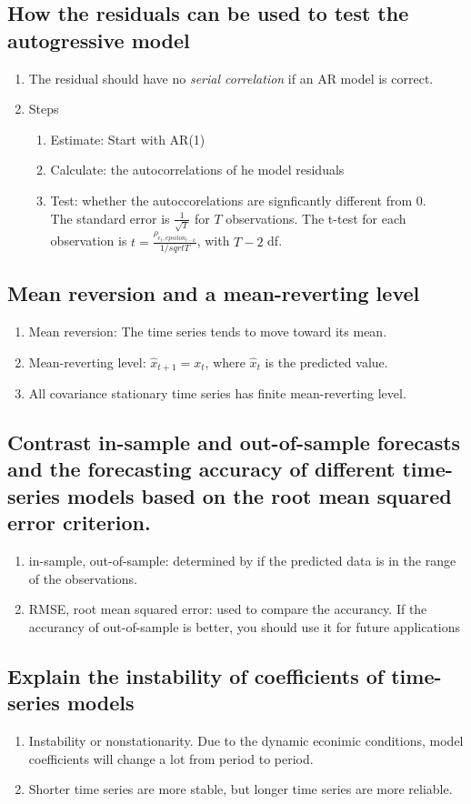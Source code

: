\documentclass{article}
\newcommand{\be}{\begin{enumerate}}
\newcommand{\ee}{\end{enumerate}}
\begin{document}
\subsection{How the residuals can be used to test the autogressive model}
\be
    \item The residual should have no {\it serial correlation} if an AR model is correct.
    \item Steps
        \be
            \item Estimate: Start with AR(1)
            \item Calculate: the autocorrelations of he model residuals
            \item Test: whether the autoccorelations are signficantly different from 0.
                \\The standard error is $\frac{1}{\sqrt{T}}$ for $T$ observations. The t-test for each
                observation is $t=\frac{\rho_{\epsilon_t,epsilon_{t-k}}}{1/sqrt{T}}$, with $T-2$ df. 
        \ee
\ee
\subsection{Mean reversion and a mean-reverting level}
\be
    \item Mean reversion: The time series tends to move toward its mean.
    \item Mean-reverting level: $\hat{x}_{t+1}=x_{t}$, where $\hat{x}_t$ is the predicted value. 
    \item All covariance stationary time series has finite mean-reverting level. 
\ee
\subsection{Contrast in-sample and out-of-sample forecasts and the forecasting accuracy of 
different time-series models based on the root mean squared error criterion.}
\be
    \item in-sample, out-of-sample: determined by if the predicted data is in the range of 
        the observations.
    \item RMSE, root mean squared error: used to compare the accurancy. If the accurancy of 
        out-of-sample is better, you should use it for future applications
\ee
\subsection{Explain the instability of coefficients of time-series models}
\be
    \item Instability or nonstationarity. Due to the dynamic econimic conditions, 
        model coefficients will change a lot from period to period. 
    \item Shorter time series are more stable, but longer time series are more reliable.
\ee
\end{document}
